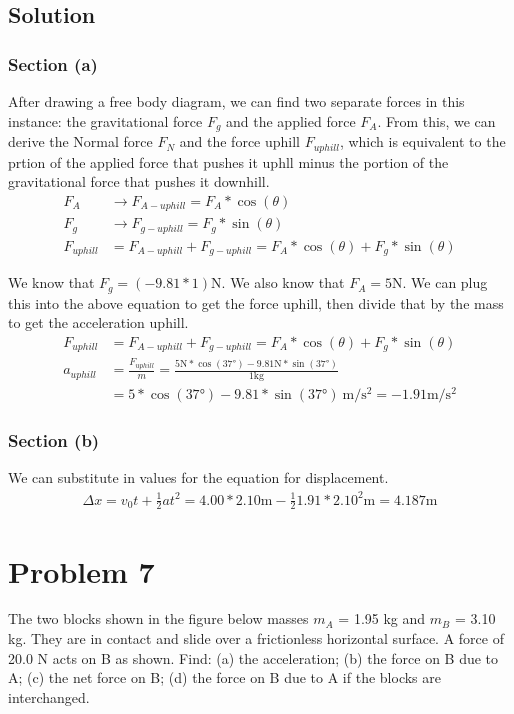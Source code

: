 \documentclass[12pt]{article}
\begin{document}
\subsection*{Solution}
\subsubsection*{Section (a)}
After drawing a free body diagram, we can find two separate forces in this instance: the gravitational force \(F_g\) and the applied force \(F_A\). From this, we can derive the Normal force \(F_N\) and the force uphill \(F_{uphill}\), which is equivalent to the prtion of the applied force that pushes it uphll minus the portion of the gravitational force that pushes it downhill. 
\begin{align*}
    F_A &\rightarrow F_{A-uphill} = F_A*\cos(\theta)\\
    F_g &\rightarrow F_{g-uphill} = F_g*\sin(\theta)\\
    F_{uphill} &= F_{A-uphill} + F_{g-uphill} 
            = F_A*\cos(\theta) + F_g*\sin(\theta)
\end{align*}

We know that $F_g = (-9.81*1) \unit{\newton}$. We also know that $F_A = 5\unit{\newton}$. We can plug this into the above equation to get the force uphill, then divide that by the mass to get the acceleration uphill.
\begin{align*}
    F_{uphill} &= F_{A-uphill} + F_{g-uphill} 
            = F_A*\cos(\theta) + F_g*\sin(\theta)\\
    a_{uphill} &= \frac{F_{uphill}}{m} = \frac{5\unit{\newton}*\cos(37\unit{\degree}) - 9.81\unit{\newton}*\sin(37\unit{\degree})}{1\unit{\kilo\gram}}\\
            &= 5*\cos(37\unit{\degree}) - 9.81*\sin(37\unit{\degree})\ \unit{\meter/\second^2} 
            = \boxed{-1.91\unit{\meter/\second^2}}
\end{align*}

\subsubsection*{Section (b)}
We can substitute in values for the equation for displacement. 
\begin{align*}
    \Delta x = v_0t + \frac{1}{2}at^2 = 4.00*2.10\unit{\meter} - \frac{1}{2}1.91*2.10^2\unit{\meter} = \boxed{4.187\unit{\meter}}
\end{align*}

\pagebreak
\section*{Problem 7}
The two blocks shown in the figure below masses $m_A$ = 1.95 kg and $m_B$ = 3.10 kg. They are in contact and slide over a frictionless horizontal surface. A force of 20.0 N acts on B as shown. Find: (a) the acceleration; (b) the force on B due to A; (c) the net force on B; (d) the force on B due to A if the blocks are interchanged.
\end{document}

